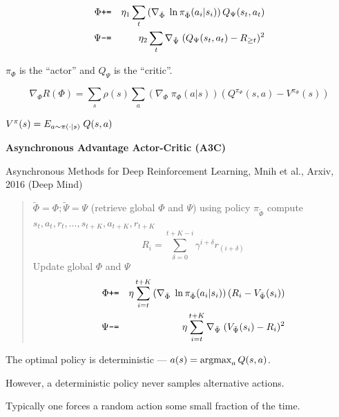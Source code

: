 {\begin{eqnarray*}
  \Phi  &\mbox{\tt +=} & \eta_1 \sum_t \left(\nabla_{\tilde{\Phi}}\;\ln \pi_{\tilde{\Phi}}(a_i|s_i)\right)Q_\Psi(s_t,a_t)\\
  \Psi & \mbox{\tt -=} & \eta_2 \sum_t \nabla_{\tilde{\Psi}}\;(Q_\Psi(s_t,a_t) - R_{\geq t})^2
\end{eqnarray*}

\vfill
$\pi_\Phi$ is the ``actor'' and $Q_\Psi$ is the ``critic''.


$$\nabla_\Phi R(\Phi) = \sum_s \rho(s) \sum_a \left(\nabla_\Phi\;\pi_\Phi(a|s)\right)(Q^{\pi_\Phi}(s,a) - V^{\pi_\Phi}(s))$$

\vfill
$V^\pi(s) = E_{a \sim \pi(\cdot|s)}\;Q(s,a)$

\slide{}
\centerline{\bf Asynchronous Advantage Actor-Critic (A3C)}

\vfill
Asynchronous Methods for Deep Reinforcement Learning, Mnih et al., Arxiv, 2016 (Deep Mind)
\vfill
\vfill


\vfill
\begin{quotation}
  \noindent $\tilde{\Phi} = \Phi; \tilde{\Psi} = \Psi$ (retrieve global $\Phi$ and $\Psi$)\newline \newline
  \noindent using policy $\pi_{\tilde{\Phi}}$ compute $s_t,a_t,r_t,\ldots,s_{t+K},a_{t+K},r_{t+K}$
  $$R_i = \sum_{\delta=0}^{t+K-i} \gamma^{i+\delta} r_{(i+\delta)}$$
Update global $\Phi$ and $\Psi$
\begin{eqnarray*}
  \Phi  &\mbox{\tt +=} & \eta \sum_{i=t}^{t+K} \left(\nabla_{\tilde{\Phi}}\;\ln \pi_{\tilde{\Phi}}(a_i|s_i)\right)\left(R_i - V_{\tilde{\Psi}}(s_i)\right)\\
  \Psi & \mbox{\tt -=} & \eta \sum_{i=t}^{t+K} \nabla_{\tilde{\Psi}}\;(V_{\tilde{\Psi}}(s_i) - R_i)^2
  \end{eqnarray*}
\end{quotation}


The optimal policy is deterministic --- $a(s) = \operatorname*{argmax}_a Q(s,a)$.

\vfill
However, a deterministic policy never samples alternative actions.

\vfill
Typically one forces a random action some small fraction of the time.



}
